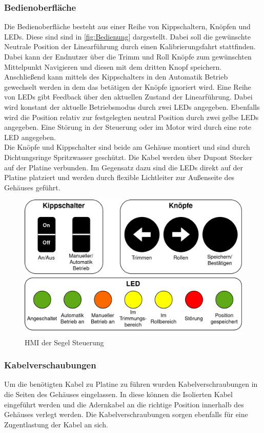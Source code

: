 \subsubsection{Bedienoberfläche}
\noindent Die Bedienoberfläche besteht aus einer Reihe von Kippschaltern, Knöpfen und LEDs. Diese sind sind in \autoref{fig:Bedienung} dargestellt. Dabei soll die gewünschte Neutrale Position der Linearführung durch einen Kalibrierungsfahrt stattfinden. Dabei kann der Endnutzer über die Trimm und Roll Knöpfe zum gewünschten Mittelpunkt Navigieren und diesen mit dem dritten Knopf speichern. Anschließend kann mittels des Kippschalters in den Automatik Betrieb gewechselt werden in dem das betätigen der Knöpfe ignoriert wird.
Eine Reihe von LEDs gibt Feedback über den aktuellen Zustand der Linearführung. Dabei wird konstant der aktuelle Betriebsmodus durch zwei LEDs angegeben. Ebenfalls wird die Position relativ zur festgelegten neutral Position durch zwei gelbe LEDs angegeben. Eine Störung in der Steuerung oder im Motor wird durch eine rote LED angegeben.\\
Die Knöpfe und Kippschalter sind beide am Gehäuse montiert und sind durch Dichtungsringe Spritzwasser geschützt. Die Kabel werden über Dupont Stecker auf der Platine verbunden. Im Gegensatz dazu sind die LEDs direkt auf der Platine platziert und werden durch flexible Lichtleiter zur Außenseite des Gehäuses geführt.
\begin{figure}[H]
	\centering
	\includegraphics[width=1.0\textwidth]{images/Hardware/Bedienung.drawio.png}
	\caption{HMI der Segel Steuerung}
	\label{fig:Bedienung}
\end{figure}
\subsubsection{Kabelverschaubungen}
Um die benötigten Kabel zu Platine zu führen wurden Kabelverschraubungen in die Seiten des Gehäuses eingelassen. In diese können die Isolierten Kabel eingeführt werden und die Adernkabel an die richtige Position innerhalb des Gehäuses verlegt werden. Die Kabelverschraubungen sorgen ebenfalls für eine Zugentlastung der Kabel an sich.

